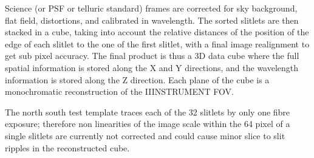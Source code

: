 Science (or PSF or telluric standard) frames are corrected for sky background, 
flat field, distortions, and calibrated in wavelength. 
The sorted slitlets are then stacked in a cube, taking into account the 
relative distances of the position of the edge of each slitlet to 
the one of the first slitlet, 
with a final image realignment to get sub pixel accuracy.
The final product is thus a 3D data cube where the full spatial information 
is stored along the X and Y directions, and the wavelength information is 
stored along the Z direction. Each plane of the cube is a monochromatic 
reconstruction of the IIINSTRUMENT FOV.

The north south test template traces each of the 32 slitlets by only one 
fibre exposure; therefore non linearities of the image scale within the 64 
pixel of a single slitlets are currently not corrected and could cause minor 
slice to slit ripples in the reconstructed cube.

